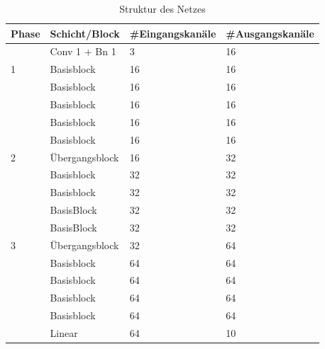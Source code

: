\begin{table}[h]
\begin{tabular}{|l|l|l|l|}
\hline
Phase & Schicht/Block                                         & \#Eingangskanäle & \#Ausgangskanäle \\ \hline
      & Conv 1 + Bn 1  & 3                & 16               \\ \hline \hline
1     & Basisblock                                             & 16               & 16               \\ \hline
      & Basisblock                                            & 16               & 16               \\ \hline
      & Basisblock                                            & 16               & 16               \\ \hline
      & Basisblock                                            & 16               & 16               \\ \hline
      & Basisblock                                            & 16               & 16               \\ \hline \hline
2     & Übergangsblock                                        & 16               & 32               \\ \hline
      & Basisblock                                            & 32               & 32               \\ \hline
      & Basisblock                                            & 32               & 32               \\ \hline
      & BasisBlock                                            & 32               & 32               \\ \hline
      & BasisBlock                                            & 32               & 32               \\ \hline \hline
3     & Übergangsblock                                        & 32               & 64               \\ \hline
      & Basisblock                                            & 64               & 64               \\ \hline
      & Basisblock                                            & 64               & 64               \\ \hline
      & Basisblock                                            & 64               & 64               \\ \hline
      & Basisblock                                            & 64               & 64               \\ \hline
      & Linear                                                & 64               & 10               \\ \hline
\end{tabular}
\caption{Struktur des Netzes}
\label{tab:baseline}
\end{table}


